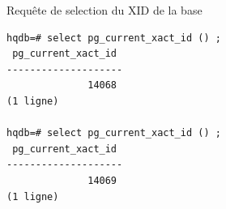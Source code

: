 \begin{frame}[fragile]{Requête de selection du XID de la base}

\begin{tiny}
\begin{Verbatim}[commandchars=\\\{\}]
hqdb=# select pg_current_xact_id () ;
 pg_current_xact_id 
--------------------
              14068
(1 ligne)

hqdb=# select pg_current_xact_id () ;
 pg_current_xact_id 
--------------------
              14069
(1 ligne)
\end{Verbatim}
\end{tiny}

\begin{toile}
\end{toile}

\end{frame}

